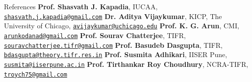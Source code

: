 \begin{rubric}{References}
\entry*[] \small\textbf{Prof. Shasvath J. Kapadia}, IUCAA, \href{shasvath.j.kapadia@gmail.com}{\texttt{shasvath.j.kapadia@gmail.com}}
\entry*[] \small\textbf{Dr. Aditya Vijaykumar}, KICP, The University of Chicago, \href{avijaykumar@uchicago.edu}{\texttt{avijaykumar@uchicago.edu}}
\entry*[] \small\textbf{Prof. K. G. Arun}, CMI, \href{arunkodanad@gmail.com}{\texttt{arunkodanad@gmail.com}}
\entry*[] \small\textbf{Prof. Sourav Chatterjee}, TIFR, \href{souravchatterjee.tifr@gmail.com}{\texttt{souravchatterjee.tifr@gmail.com}}
\entry*[] \small\textbf{Prof. Basudeb Dasgupta}, TIFR, \href{bdasgupta@theory.tifr.res.in}{\texttt{bdasgupta@theory.tifr.res.in}}
\entry*[] \small\textbf{Prof. Susmita Adhikari}, IISER Pune, \href{susmita@iiserpune.ac.in}{\texttt{susmita@iiserpune.ac.in}}
\entry*[] \small\textbf{Prof. Tirthankar Roy Choudhury}, NCRA-TIFR, \href{troych75@gmail.com}{\texttt{troych75@gmail.com}}
    
\end{rubric}
